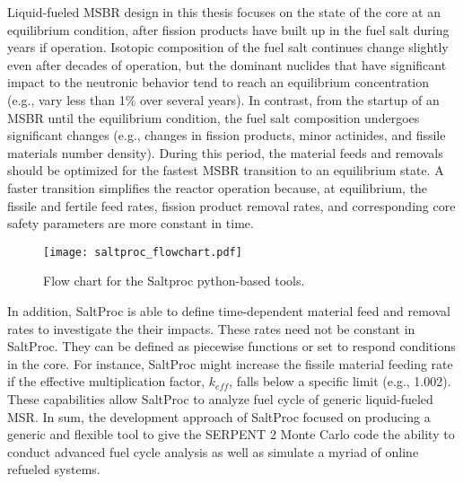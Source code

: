 Liquid-fueled \gls{MSBR} design in this thesis focuses on the state of the core at an equilibrium condition, after fission products have built up in the fuel salt during years if operation. Isotopic composition of the fuel salt continues change slightly even after decades of operation, but the dominant nuclides that have significant impact to the neutronic behavior tend to reach an equilibrium concentration (e.g., vary less than 1\% over several years). In contrast, from the startup of an \gls{MSBR} until the equilibrium condition, the fuel salt composition undergoes significant changes (e.g., changes in fission products, minor actinides, and fissile materials number density). During this period, the material feeds and removals should be optimized for the fastest \gls{MSBR} transition to an equilibrium state. A faster transition simplifies the reactor operation because, at equilibrium, the fissile and fertile feed rates, fission product removal rates, and corresponding core safety parameters are more constant in time.

\begin{figure}[htp!] %
  \centering
  \vspace{-0.3em}
  \texttt{[image: saltproc\_flowchart.pdf]}
  \caption{Flow chart for the Saltproc python-based tools.}
  \vspace{-0.6em}
  \label{fig:saltproc_flow}
\end{figure}
\FloatBarrier

In addition, SaltProc is able to define time-dependent material feed and removal rates to investigate the their impacts. These rates need not be constant in SaltProc. They can be defined as piecewise functions or set to respond conditions in the core. For instance, SaltProc might increase the fissile material feeding rate if the effective multiplication factor, $k_{eff}$, falls below a specific limit (e.g., 1.002). 
These capabilities allow SaltProc to analyze fuel cycle of generic liquid-fueled \gls{MSR}. In sum, the development approach of SaltProc focused on producing a generic and flexible tool to give the SERPENT 2 Monte Carlo code the ability to conduct advanced fuel cycle analysis as well as simulate a myriad of online refueled systems.

